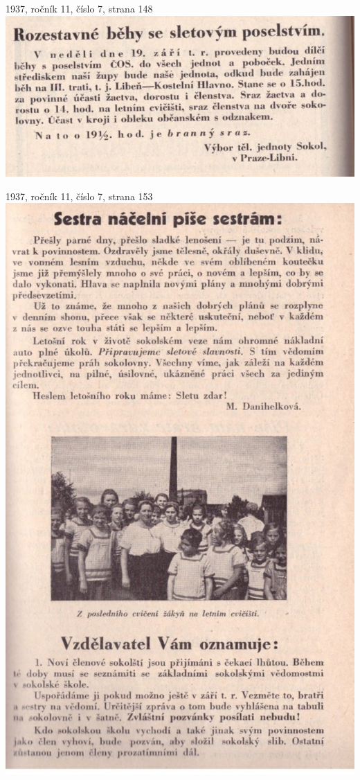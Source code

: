 \documentclass[11pt]{article}
\begin{document}
\vspace*{\baselineskip}
1937, ročník 11, číslo 7, strana 148 \\
\includegraphics[width=\imagewidth]{original/1937/Skener_20250325 (4).jpg}

1937, ročník 11, číslo 7, strana 153 \\
\includegraphics[width=\imagewidth]{original/1937/Skener_20250325 (5).jpg}
\end{document}

